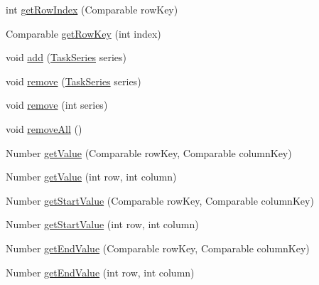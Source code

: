 \begin{DoxyCompactItemize}
int \mbox{\hyperlink{classorg_1_1jfree_1_1data_1_1gantt_1_1_task_series_collection_a4398f6c557565408f40cda1e11e16a08}{get\+Row\+Index}} (Comparable row\+Key)
\item 
Comparable \mbox{\hyperlink{classorg_1_1jfree_1_1data_1_1gantt_1_1_task_series_collection_adf6c7e868a48a871bfec44f2a14a00e9}{get\+Row\+Key}} (int index)
\item 
void \mbox{\hyperlink{classorg_1_1jfree_1_1data_1_1gantt_1_1_task_series_collection_a50b5ed894ab9b68afcd873839230eb27}{add}} (\mbox{\hyperlink{classorg_1_1jfree_1_1data_1_1gantt_1_1_task_series}{Task\+Series}} series)
\item 
void \mbox{\hyperlink{classorg_1_1jfree_1_1data_1_1gantt_1_1_task_series_collection_ad2538fd7634247366da097b4388830b5}{remove}} (\mbox{\hyperlink{classorg_1_1jfree_1_1data_1_1gantt_1_1_task_series}{Task\+Series}} series)
\item 
void \mbox{\hyperlink{classorg_1_1jfree_1_1data_1_1gantt_1_1_task_series_collection_a39d5e0975202db44927e45e7cf487643}{remove}} (int series)
\item 
void \mbox{\hyperlink{classorg_1_1jfree_1_1data_1_1gantt_1_1_task_series_collection_ab6e84efa5e184731095f371f6a903bf0}{remove\+All}} ()
\item 
Number \mbox{\hyperlink{classorg_1_1jfree_1_1data_1_1gantt_1_1_task_series_collection_a89f6f1df4d88768e84b3bd313cbd3eab}{get\+Value}} (Comparable row\+Key, Comparable column\+Key)
\item 
Number \mbox{\hyperlink{classorg_1_1jfree_1_1data_1_1gantt_1_1_task_series_collection_ab786a9bbf3021d71aa0324257401ec8c}{get\+Value}} (int row, int column)
\item 
Number \mbox{\hyperlink{classorg_1_1jfree_1_1data_1_1gantt_1_1_task_series_collection_a2751e6bff5ed9e14360182d2c6c5a4bf}{get\+Start\+Value}} (Comparable row\+Key, Comparable column\+Key)
\item 
Number \mbox{\hyperlink{classorg_1_1jfree_1_1data_1_1gantt_1_1_task_series_collection_a99c30250fe009aadb13b6f92e35e7d49}{get\+Start\+Value}} (int row, int column)
\item 
Number \mbox{\hyperlink{classorg_1_1jfree_1_1data_1_1gantt_1_1_task_series_collection_a93e90606e5261c2fa4ba8a1026f78a1e}{get\+End\+Value}} (Comparable row\+Key, Comparable column\+Key)
\item 
Number \mbox{\hyperlink{classorg_1_1jfree_1_1data_1_1gantt_1_1_task_series_collection_abbfc5aad2b32ff17739295460335f57e}{get\+End\+Value}} (int row, int column)
\item 

\end{DoxyCompactItemize}
